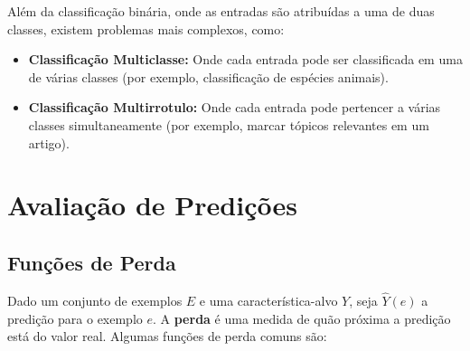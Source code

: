 \documentclass{article}
\begin{document}
Além da classificação binária, onde as entradas são atribuídas a uma de duas classes, existem problemas mais complexos, como:

\begin{itemize}
    \item \textbf{Classificação Multiclasse:} Onde cada entrada pode ser classificada em uma de várias classes (por exemplo, classificação de espécies animais).
    \item \textbf{Classificação Multirrotulo:} Onde cada entrada pode pertencer a várias classes simultaneamente (por exemplo, marcar tópicos relevantes em um artigo).
\end{itemize}

\section{Avaliação de Predições}

\subsection{Funções de Perda}

Dado um conjunto de exemplos $E$ e uma característica-alvo $Y$, seja $\hat{Y}(e)$ a predição para o exemplo $e$. A \textbf{perda} é uma medida de quão próxima a predição está do valor real. Algumas funções de perda comuns são:
\end{document}
